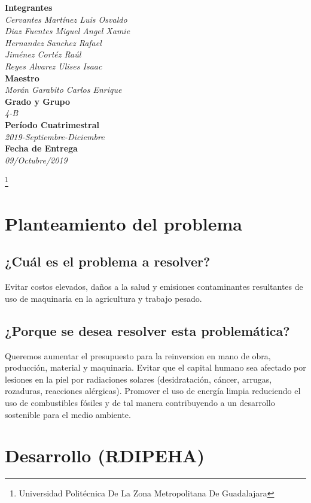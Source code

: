\documentclass[11pt,a4paper]{article}
\begin{document}
\begin{center}
\textbf{Integrantes}
\\\textit{Cervantes Martínez Luis Osvaldo\\Diaz Fuentes Miguel Angel Xamie\\Hernandez Sanchez Rafael\\Jiménez Cortéz Raúl\\Reyes Alvarez Ulises Isaac}
\\\textbf{Maestro}
\\\textit{Morán Garabito Carlos Enrique}\\

\textbf{Grado y Grupo}\\
\emph{4-B}\\
\textbf{Período Cuatrimestral}\\
\textit{2019-Septiembre-Diciembre}
\\
\textbf{Fecha de Entrega}\\
\textit{09/Octubre/2019}


\end{center}

\footnote{Universidad Politécnica De La Zona Metropolitana De Guadalajara} 

\newpage

\section{Planteamiento del problema}
\subsection{¿Cuál es el problema a resolver?}
Evitar costos elevados, daños a la salud y emisiones contaminantes resultantes de uso de maquinaria en la agricultura y trabajo pesado.\\
\subsection{¿Porque se desea resolver esta problemática?}
Queremos aumentar el presupuesto para la reinversion en mano de obra, producción, material y maquinaria. Evitar que el capital humano sea afectado por lesiones en la piel por radiaciones solares (desidratación, cáncer, arrugas, rozaduras, reacciones alérgicas). Promover el uso de energía limpia reduciendo el uso de combustibles fósiles y de tal manera contribuyendo  a un desarrollo sostenible para el medio ambiente.
\section{Desarrollo (RDIPEHA)} 
\end{document}
